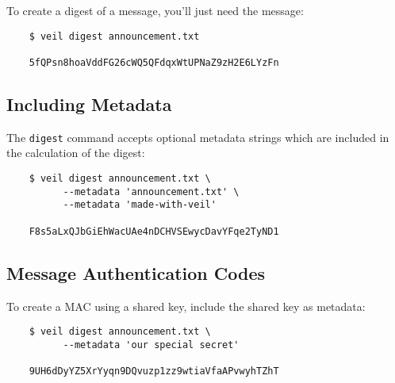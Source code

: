 \documentclass{scrartcl}
\begin{document}
To create a digest of a message, you'll just need the message:

\begin{verbatim}
    $ veil digest announcement.txt

    5fQPsn8hoaVddFG26cWQ5QFdqxWtUPNaZ9zH2E6LYzFn
    \end{verbatim}

\subsection{Including Metadata}\label{subsec:including-metadata}

The \texttt{digest} command accepts optional metadata strings which are included in the calculation
of the digest:

\begin{verbatim}
    $ veil digest announcement.txt \
          --metadata 'announcement.txt' \
          --metadata 'made-with-veil'

    F8s5aLxQJbGiEhWacUAe4nDCHVSEwycDavYFqe2TyND1
    \end{verbatim}

\subsection{Message Authentication Codes}\label{subsec:message-authentication-codes}

To create a MAC using a shared key, include the shared key as metadata:

\begin{verbatim}
    $ veil digest announcement.txt \
          --metadata 'our special secret'

    9UH6dDyYZ5XrYyqn9DQvuzp1zz9wtiaVfaAPvwyhTZhT
    \end{verbatim}
\end{document}
